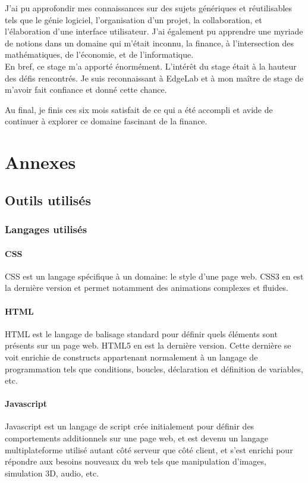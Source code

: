 \documentclass[a4paper,french,12pt]{article}
\begin{document}
	J'ai pu approfondir mes connaissances sur des sujets génériques et réutilisables tels que le génie logiciel, l'organisation d'un projet, la collaboration, et l'élaboration d'une interface utilisateur. J'ai également pu apprendre une myriade de notions dans un domaine qui m'était inconnu, la finance, à l'intersection des mathématiques, de l'économie, et de l'informatique.~\\
	
	En bref, ce stage m'a apporté énormément. L'intérêt du stage était à la hauteur des défis rencontrés.
	Je suis reconnaissant à EdgeLab et à mon maître de stage de m'avoir fait confiance et donné cette chance.

	Au final, je finis ces six mois satisfait de ce qui a été accompli et avide de continuer à explorer ce domaine fascinant de la finance.
	\newpage
\section{Annexes}

	\subsection{Outils utilisés}

		\subsubsection{Langages utilisés}
		
			\paragraph{CSS}
			CSS est un langage spécifique à un domaine: le style d'une page web. CSS3 en est la dernière version et permet notamment des animations complexes et fluides.
			
			\paragraph{HTML}
			HTML est le langage de balisage standard pour définir quels éléments sont présents sur un page web. HTML5 en est la dernière version. Cette dernière se voit enrichie de constructs appartenant normalement à un langage de programmation tels que conditions, boucles, déclaration et définition de variables, etc.
			
		
			\paragraph{Javascript}
			Javascript est un langage de script crée initialement pour 
			définir des comportements additionnels sur une page web, et 				est devenu un langage multiplateforme utilisé autant côté serveur que côté client, et s'est enrichi pour répondre aux besoins nouveaux du web tels que manipulation d'images, simulation 3D, audio, etc.
			
\end{document}
